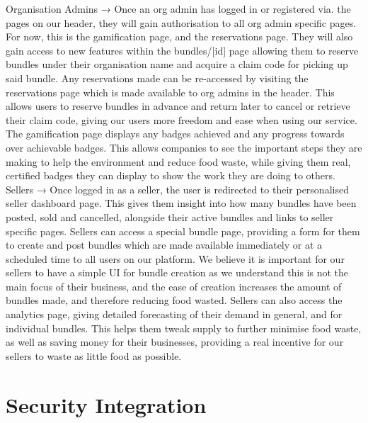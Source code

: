 \documentclass[11pt, a4paper]{report}
\begin{document}
	Organisation Admins → Once an org admin has logged in or registered via. the pages on our header, they will gain authorisation to all org admin specific pages. For now, this is the gamification page, and the reservations page. They will also gain access to new features within the bundles/[id] page allowing them to reserve bundles under their organisation name and acquire a claim code for picking up said bundle.
	Any reservations made can be re-accessed by visiting the reservations page which is made available to org admins in the header. This allows users to reserve bundles in advance and return later to cancel or retrieve their claim code, giving our users more freedom and ease when using our service. The gamification page displays any badges achieved and any progress towards over achievable badges. This allows companies to see the important steps they are making to help the environment and reduce food waste, while giving them real, certified badges they can display to show the work they are doing to others.\\
	
	Sellers → Once logged in as a seller, the user is redirected to their personalised seller dashboard page. This gives them insight into how many bundles have been posted, sold and cancelled, alongside their active bundles and links to seller specific pages.	Sellers can access a special bundle page, providing a form for them to create and post bundles which are made available immediately or at a scheduled time to all users on our platform. We believe it is important for our sellers to have a simple UI for bundle creation as we understand this is not the main focus of their business, and the ease of creation increases the amount of bundles made, and therefore reducing food wasted. Sellers can also access the analytics page, giving detailed forecasting of their demand in general, and for individual bundles. This helps them tweak supply to further minimise food waste, as well as saving money for their businesses, providing a real incentive for our sellers to waste as little food as possible.
	
	\section{Security Integration}
	
\end{document}
